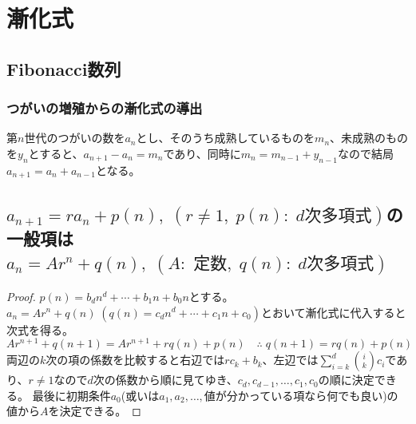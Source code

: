     \section{漸化式}
        \subsection{Fibonacci数列}
            \subsubsection{つがいの増殖からの漸化式の導出}
                第$n$世代のつがいの数を$a_n$とし、そのうち成熟しているものを$m_n$、未成熟のものを$y_n$とすると、$a_{n+1} - a_n = m_n$であり、同時に$m_n = m_{n-1} + y_{n-1}$なので結局$a_{n+1} = a_n + a_{n-1}$となる。
        \subsection{\texorpdfstring{$a_{n+1}=ra_n + p(n),\;(r\neq1 ,\;p(n):\;d\text{次多項式})$}{a\_\{n+1\} = ra\_n + p(n) (r≠1, p(n): d次多項式)}の一般項は\texorpdfstring{$a_n = Ar^n + q(n),\;(A:\text{ 定数},\;q(n):\;d\text{次多項式})$}{a\_n = Ar\string^n + q(n) (A: 定数, q(n): d次多項式)}}
            \begin{proof}
                \quad\par
                $p(n) = b_dn^d + \dotsb + b_1n + b_0n$とする。
                $a_n = Ar^n + q(n)\;\left(q(n) = c_dn^d + \dotsb + c_1n + c_0\right)$とおいて漸化式に代入すると次式を得る。
                \[ Ar^{n+1} + q(n+1) = Ar^{n+1} + rq(n) + p(n) \quad \therefore\; q(n+1) = rq(n) + p(n) \]
                両辺の$k$次の項の係数を比較すると右辺では$rc_k + b_k$、左辺では$\sum_{i=k}^d\binom{i}{k}c_i$であり、$r\neq 1$なので$d$次の係数から順に見てゆき、$c_d,c_{d-1},\dotsc,c_1,c_0$の順に決定できる。
                最後に初期条件$a_0$(或いは$a_1,a_2,\dotsc,$\;値が分かっている項なら何でも良い)の値から$A$を決定できる。
            \end{proof}
